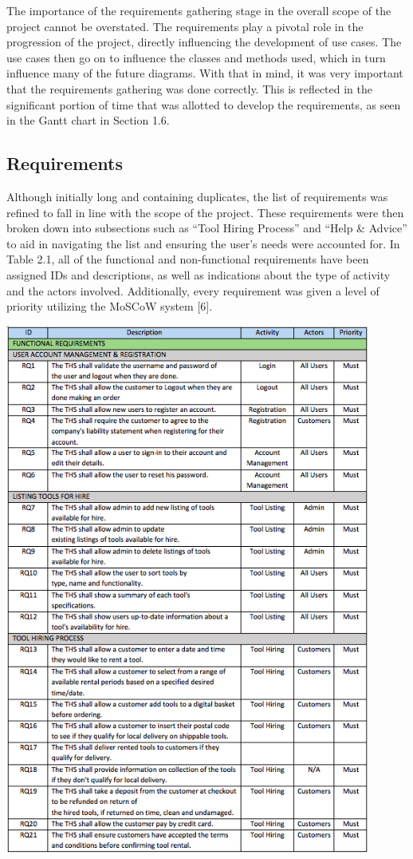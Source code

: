The importance of the requirements gathering stage in the overall scope
of the project cannot be overstated. The requirements play a pivotal
role in the progression of the project, directly influencing the
development of use cases. The use cases then go on to influence the
classes and methods used, which in turn influence many of the future
diagrams. With that in mind, it was very important that the requirements
gathering was done correctly. This is reflected in the significant
portion of time that was allotted to develop the requirements, as seen
in the Gantt chart in Section 1.6.

\hypertarget{requirements}{%
\subsection{Requirements}\label{requirements}}

Although initially long and containing duplicates, the list of
requirements was refined to fall in line with the scope of the project.
These requirements were then broken down into subsections such as ``Tool
Hiring Process'' and ``Help \& Advice'' to aid in navigating the list
and ensuring the user's needs were accounted for. In Table 2.1, all of
the functional and non-functional requirements have been assigned IDs
and descriptions, as well as indications about the type of activity and
the actors involved. Additionally, every requirement was given a level
of priority utilizing the MoSCoW system {[}6{]}.

\begin{table}[H]
      \centering
      \includegraphics[trim = 0 0 0 0, clip, width=0.9\textwidth]{TempImg/req1.png}
 \end{table}

